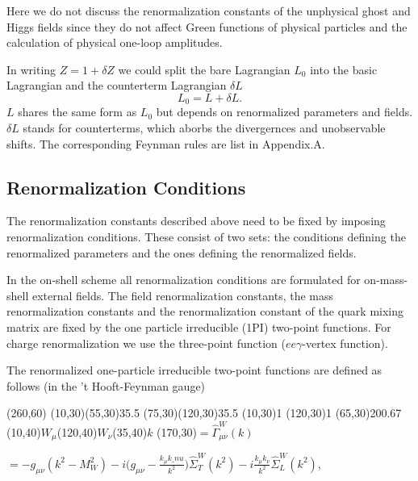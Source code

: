 Here we do not discuss the renormalization constants of the unphysical ghost and Higgs fields since they do not affect Green functions of physical particles and the calculation of physical one-loop amplitudes.

In writing $Z=1+\delta Z$ we could split the bare Lagrangian $L_0$ into the basic Lagrangian and the counterterm Lagrangian $\delta L$
\begin{equation}
L_0=L+\delta L.
\end{equation} 
$L$ shares the same form as $L_0$ but depends on renormalized parameters and fields. $\delta L$ stands for counterterms, which aborbs the divergernces and unobservable shifts. The corresponding Feynman rules are list in Appendix.A.

\subsection{Renormalization Conditions}
The renormalization constants described above need to be fixed by imposing renormalization conditions. These consist of two sets: the conditions defining the renormalized parameters and the ones defining the renormalized fields.

In the on-shell scheme all renormalization conditions are formulated for on-mass-shell external fields. The field renormalization constants, the mass renormalization constants and the renormalization constant of the quark mixing matrix are fixed by the one particle irreducible (1PI) two-point functions. For charge renormalization we use the three-point function ($ee\gamma$-vertex function). 

The renormalized one-particle irreducible two-point functions are defined as follows (in the 't Hooft-Feynman gauge)

\begin{axopicture}(260,60) %
	\Photon(10,30)(55,30){3}{5.5}
	\Photon(75,30)(120,30){3}{5.5}
	\Vertex(10,30){1}
	\Vertex(120,30){1}
	\GCirc(65,30){20}{0.67}
	\Text(10,40){$W_\mu$}\Text(120,40){$W_\nu$}\Text(35,40){$k$}
	\Text(170,30){$=\hat{\Gamma}^W_{\mu\nu}(k)$}	
\end{axopicture}	
\newline$=-g_{\mu\nu}(k^2-M_W^2)-i\bigl(g_{\mu\nu}-\frac{k_\mu k\_nu}{k^2}\bigr)\hat{\Sigma}^W_T(k^2)-i\frac{k_\mu k_\nu}{k^2}\hat{\Sigma}^W_L(k^2)$,
\newline
\newline

